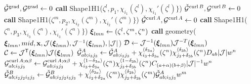 \begin{algorithm}[ht!]
\begin{algorithmic}
\State $\check{\mathcal{G}}^{\operatorname{grad}},\mathcal{G}^{\operatorname{grad}}\gets 0$
    \State\textbf{call } Shape1H1($\zeta^l,p_1,\chi_{i_1}(\zeta^l),\chi_{i_1}'(\zeta^l)\}$) 
            \State $\check{\mathcal{G}}^{\operatorname{curl} B},\mathcal{G}^{\operatorname{curl} B}\gets 0$
                \State\textbf{call } Shape1H1($\zeta^m,p_2,\chi_{i_2}(\zeta^m),\chi_{i_2}'(\zeta^m)\}$) 
                \State $\check{\mathcal{G}}^{\operatorname{curl} A},\mathcal{G}^{\operatorname{curl} A}\gets 0$
                    \State\textbf{call } Shape1H1($\zeta^n,p_3,\chi_{i_3}(\zeta^n),\chi_{i_3}'(\zeta^n)\}$) 
                    \State $\boldsymbol{\xi}_{lmn}\gets (\zeta^l,\zeta^m,\zeta^n)$
                    \State\textbf{call } geometry( $\boldsymbol{\xi}_{lmn},mid,\mathbf{x},\mathcal{J}(\boldsymbol{\xi}_{lmn}),\mathcal{J}^{-1}(\boldsymbol{\xi}_{lmn}),|\mathcal{J}|$)
                    \State $\mathcal{D}\gets\mathcal{J}^{-1}(\boldsymbol{\xi}_{lmn})\mathcal{J}^{-T}(\boldsymbol{\xi}_{lmn})$
                    \State $\mathcal{C}\gets\mathcal{J}^{\mathsf{T}}(\boldsymbol{\xi}_{lmn})\mathcal{J}(\boldsymbol{\xi}_{lmn})$
                            \State$\check{\mathcal{G}}_{ab;i_3j_3}^{A}\gets \check{\mathcal{G}}_{ab;i_3j_3}^{A} + \chi_{i_3+\delta_{3a}}^{\langle\delta_{3a}\rangle}(\zeta^n) \chi_{j_3+\delta_{3b}}^{\langle\delta_{3b}\rangle}(\zeta^n)D_{ab} |\mathcal{J}| w^n$
                            \State$\mathcal{G}_{ab;i_3j_3}^{\operatorname{curl} A;\alpha \beta}\gets \mathcal{G}_{ab;i_3j_3}^{\operatorname{curl} A;\alpha \beta} + \chi_{i_3+\delta_{3a}}^{\langle1-\delta_{3a}\rangle}(\zeta^n) \chi_{j_3+\delta_{3b}}^{\langle1-\delta_{3b}\rangle}(\zeta^n) C_{(a+\alpha)(b+\beta)} |\mathcal{J}|^{-1} w^n$ \Comment{(\ref{GA_hcurl1})}
                            \EndFor
                        \EndIf
                    \EndFor
                \EndFor
                                    \State$\check{\mathcal{G}}_{ab;i_2j_2i_3j_3}^{B}\gets \check{\mathcal{G}}_{ab;i_2j_2i_3j_3}^{B} + \chi_{i_2+\delta_{2a}}^{\langle\delta_{2a}\rangle}(\zeta^m) \chi_{j_2+\delta_{2b}}^{\langle\delta_{2b}\rangle}(\zeta^m) \check{\mathcal{G}}_{ab;i_3j_3}^{A} w^m$

\end{algorithmic}
\end{algorithm}
